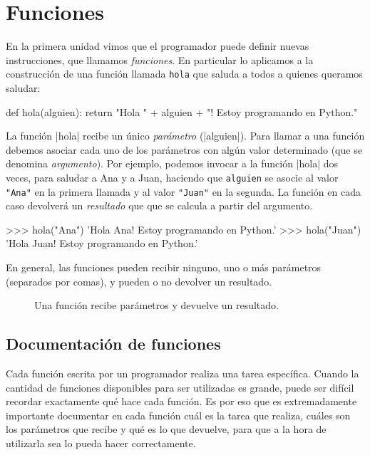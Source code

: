 \chapter[Funciones]{Funciones}
\label{chapter:funciones}

En la primera unidad vimos que el programador puede definir nuevas
instrucciones, que llamamos \emph{funciones}. En particular lo aplicamos a la
construcción de una función llamada \lstinline+hola+ que saluda a todos a
quienes queramos saludar:

\begin{codigo-python-sn}
def hola(alguien):
	return "Hola " + alguien + "! Estoy programando en Python."
\end{codigo-python-sn}

La función |hola| recibe un único \emph{parámetro} (|alguien|). Para llamar a
una función debemos asociar cada uno de los parámetros con algún valor
determinado (que se denomina \emph{argumento}). Por ejemplo, podemos invocar a
la función |hola| dos veces, para saludar a Ana y a Juan, haciendo que
\lstinline+alguien+ se asocie al valor \lstinline!"Ana"! en la primera llamada
y al valor \lstinline!"Juan"! en la segunda. La función en cada caso devolverá
un \emph{resultado} que que se calcula a partir del argumento.

\begin{codigo-python-sn}
>>> hola("Ana")
'Hola Ana! Estoy programando en Python.'
>>> hola("Juan")
'Hola Juan! Estoy programando en Python.'
\end{codigo-python-sn}

En general, las funciones pueden recibir ninguno, uno o más parámetros
(separados por comas), y pueden o no devolver un resultado.

\begin{figure}[ht]
\begin{center}

\end{center}
\caption{Una función recibe parámetros y devuelve un resultado.}
\end{figure}

\section{Documentación de funciones}

Cada función escrita por un programador realiza una tarea específica.  Cuando
la cantidad de funciones disponibles para ser utilizadas es grande, puede ser
difícil recordar exactamente qué hace cada función.  Es por eso que es
extremadamente importante documentar en cada función cuál es la tarea que
realiza, cuáles son los parámetros que recibe y qué es lo que devuelve, para
que a la hora de utilizarla sea lo pueda hacer correctamente.

